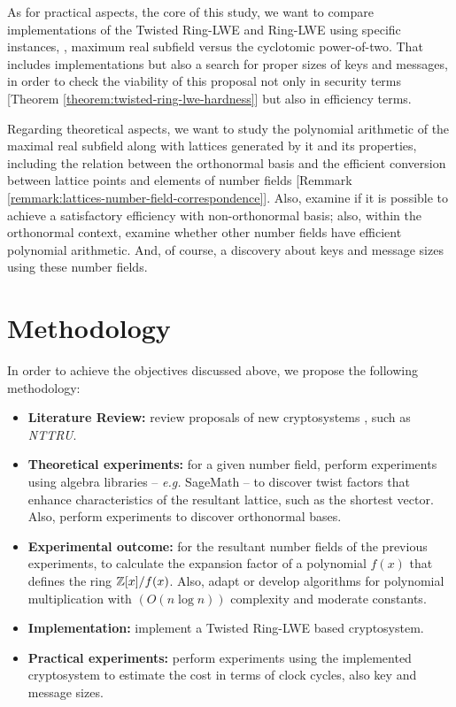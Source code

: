 \documentclass[a4paper,12pt]{article}
\begin{document}
As for practical aspects, the core of this study, we want to compare  implementations  of the Twisted Ring-LWE and Ring-LWE using specific instances, \ie, maximum real subfield versus the cyclotomic power-of-two. That includes  implementations but also a search for proper sizes of  keys and  messages, in order to check the viability of this proposal not only in security terms [Theorem \ref{theorem:twisted-ring-lwe-hardness}] but also in efficiency terms.

Regarding theoretical aspects, we want to study the polynomial arithmetic of the maximal real subfield along with lattices generated by it and its properties, including the relation between the orthonormal basis and the efficient conversion between lattice points and elements of number fields [Remmark \ref{remmark:lattices-number-field-correspondence}]. Also, examine if it is possible to achieve a satisfactory efficiency with non-orthonormal basis; also, within the orthonormal context, examine whether other number fields have efficient polynomial arithmetic. And, of course, a discovery about keys and message sizes using these number fields.
\section{Methodology}
\label{methodology}
In order to achieve the objectives discussed above, we propose the following methodology:
\begin{itemize}
\item \textbf{Literature Review:} review proposals of new cryptosystems , such as \emph{NTTRU}.
\item \textbf{Theoretical experiments:} for a given number field, perform experiments using algebra libraries -- \emph{e.g.} SageMath -- to discover twist factors that enhance characteristics of the resultant lattice, such as the shortest vector. Also, perform experiments to discover orthonormal bases.
\item \textbf{Experimental outcome:} for the resultant number fields of the previous experiments, to calculate the expansion factor of a polynomial \(f(x)\) that defines the ring \(\mathbb{Z}[x]/f(x)\). Also,  adapt or develop algorithms for polynomial multiplication with \((O(n\log{n}))\) complexity and moderate constants.
\item \textbf{Implementation:} implement a Twisted Ring-LWE based cryptosystem.
\item \textbf{Practical experiments:} perform experiments using the implemented cryptosystem to estimate the cost in terms of clock cycles, also key and message sizes.
\end{itemize}
\end{document}
